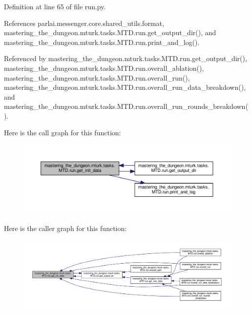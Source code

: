 Definition at line 65 of file run.\+py.



References parlai.\+messenger.\+core.\+shared\+\_\+utils.\+format, mastering\+\_\+the\+\_\+dungeon.\+mturk.\+tasks.\+M\+T\+D.\+run.\+get\+\_\+output\+\_\+dir(), and mastering\+\_\+the\+\_\+dungeon.\+mturk.\+tasks.\+M\+T\+D.\+run.\+print\+\_\+and\+\_\+log().



Referenced by mastering\+\_\+the\+\_\+dungeon.\+mturk.\+tasks.\+M\+T\+D.\+run.\+get\+\_\+output\+\_\+dir(), mastering\+\_\+the\+\_\+dungeon.\+mturk.\+tasks.\+M\+T\+D.\+run.\+overall\+\_\+ablation(), mastering\+\_\+the\+\_\+dungeon.\+mturk.\+tasks.\+M\+T\+D.\+run.\+overall\+\_\+run(), mastering\+\_\+the\+\_\+dungeon.\+mturk.\+tasks.\+M\+T\+D.\+run.\+overall\+\_\+run\+\_\+data\+\_\+breakdown(), and mastering\+\_\+the\+\_\+dungeon.\+mturk.\+tasks.\+M\+T\+D.\+run.\+overall\+\_\+run\+\_\+rounds\+\_\+breakdown().

Here is the call graph for this function\+:
\nopagebreak
\begin{figure}[H]
\begin{center}
\leavevmode
\includegraphics[width=350pt]{namespacemastering__the__dungeon_1_1mturk_1_1tasks_1_1MTD_1_1run_af11196d8dedb6354bfadb6fe86276a04_cgraph}
\end{center}
\end{figure}
Here is the caller graph for this function\+:
\nopagebreak
\begin{figure}[H]
\begin{center}
\leavevmode
\includegraphics[width=350pt]{namespacemastering__the__dungeon_1_1mturk_1_1tasks_1_1MTD_1_1run_af11196d8dedb6354bfadb6fe86276a04_icgraph}
\end{center}
\end{figure}
\mbox{\label{namespacemastering__the__dungeon_1_1mturk_1_1tasks_1_1MTD_1_1run_a62781f44b43636ee721e462700efeeac}} 
